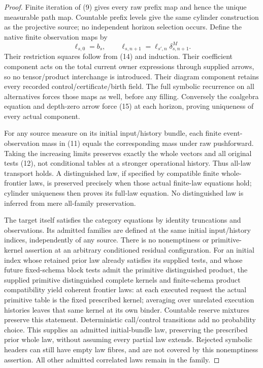 \documentclass[11pt]{article}
\begin{document}
\begin{proof}
Finite iteration of (9) gives every raw prefix map and hence the unique measurable path map. Countable prefix levels give the same cylinder construction as the projective source; no independent horizon selection occurs. Define the native finite observation maps by
\[
 \ell_{s,0}=b_s,\qquad
 \ell_{s,n+1}=\ell_{s',n}\delta^M_{s,n+1}.                \tag{15}
\]
Their restriction squares follow from (14) and induction. Their coefficient component acts on the total current owner expressions through supplied arrows, so no tensor/product interchange is introduced. Their diagram component retains every recorded control/certificate/birth field. The full symbolic recurrence on all alternatives forces those maps as well, before any filling. Conversely the coalgebra equation and depth-zero arrow force (15) at each horizon, proving uniqueness of every actual component.

For any source measure on its initial input/history bundle, each finite event-observation mass in (11) equals the corresponding mass under raw pushforward. Taking the increasing limits preserves exactly the whole vectors and all original tests (12), not conditional tables at a stronger operational history. Thus all-law transport holds. A distinguished law, if specified by compatible finite whole-frontier laws, is preserved precisely when those actual finite-law equations hold; cylinder uniqueness then proves its full-law equation. No distinguished law is inferred from mere all-family preservation.

The target itself satisfies the category equations by identity truncations and observations. Its admitted families are defined at the same initial input/history indices, independently of any source. There is no nonemptiness or primitive-kernel assertion at an arbitrary conditioned residual configuration. For an initial index whose retained prior law already satisfies its supplied tests, and whose future fixed-schema block tests admit the primitive distinguished product, the supplied primitive distinguished complete kernels and finite-schema product compatibility yield coherent frontier laws: at each executed request the actual primitive table is the fixed prescribed kernel; averaging over unrelated execution histories leaves that same kernel at its own binder. Countable reserve mixtures preserve this statement. Deterministic call/control transitions add no probability choice. This supplies an admitted initial-bundle law, preserving the prescribed prior whole law, without assuming every partial law extends. Rejected symbolic headers can still have empty law fibres, and are not covered by this nonemptiness assertion. All other admitted correlated laws remain in the family.
\end{proof}
\end{document}
